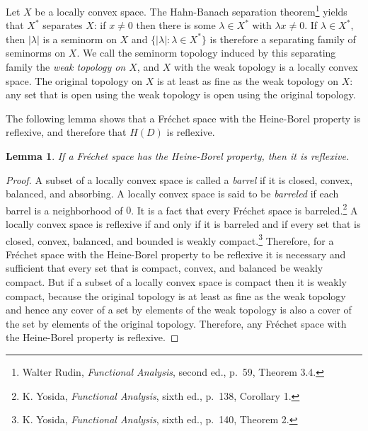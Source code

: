 \documentclass{article}
\newtheorem{lemma}[theorem]{Lemma}
\begin{document}
Let $X$ be a locally convex space. The Hahn-Banach separation theorem\footnote{Walter Rudin, {\em Functional Analysis}, second ed., p.~59, Theorem 3.4.}
yields that $X^*$ separates $X$: if $x \neq 0$ then there is some $\lambda \in X^*$ with $\lambda x \neq 0$. If $\lambda \in X^*$, then $|\lambda|$ is a seminorm
on $X$ and $\{|\lambda|: \lambda \in X^*\}$ is therefore a separating family of seminorms on $X$. We call the seminorm topology induced by this separating family
the {\em weak topology on $X$}, and $X$ with the weak topology is a locally convex space.
The original topology on $X$ is at least as fine as the weak topology on $X$: any set that is open using
the weak topology is open using the original topology.

 
 The following lemma shows that a Fr\'echet space with the Heine-Borel property is reflexive, and therefore that $H(D)$ is reflexive.
 
 \begin{lemma}
 If a Fr\'echet space has the Heine-Borel property, then it is reflexive.
 \end{lemma}
 \begin{proof}
A subset of a locally convex space is called a {\em barrel} if it is closed, convex, balanced, and absorbing.
A locally convex space is said to be {\em barreled} if each barrel is a neighborhood of $0$. It is a fact that every Fr\'echet space is barreled.\footnote{K. Yosida,
{\em Functional Analysis}, sixth ed., p.~138, Corollary 1.}
A locally convex space is reflexive if and only if it is barreled and 
if every set that is closed, convex, balanced, and bounded is weakly compact.\footnote{K. Yosida,
{\em Functional Analysis}, sixth ed., p.~140, Theorem 2.} Therefore, for a Fr\'echet space with the Heine-Borel property
 to be reflexive it is necessary and sufficient that every set that is compact, convex, and balanced be weakly compact.
But if a subset of a locally convex space is compact then it is weakly compact, because the original topology is at least as fine as the weak topology and hence
any cover of a set by elements of the weak topology is also a cover of the set by elements of the original topology. Therefore, any Fr\'echet space with the Heine-Borel property
is reflexive.
\end{proof}
\end{document}
